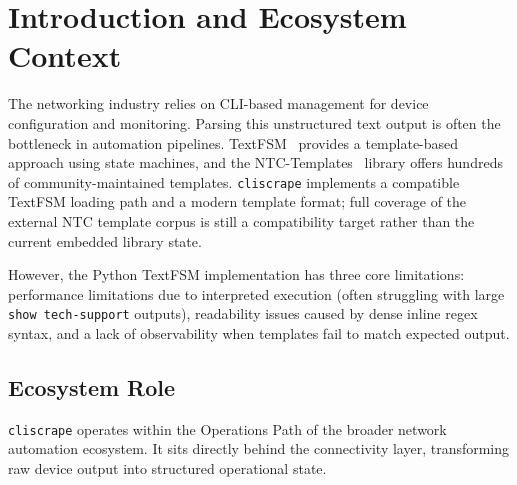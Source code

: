 \documentclass[a4paper,10pt]{article}
\begin{document}
\begin{acronym}[TextFSM]
\end{acronym}

\clearpage

\section{Introduction and Ecosystem Context}
\label{sec:intro}

The networking industry relies on CLI-based management for device
configuration and monitoring.  Parsing this unstructured text output
is often the bottleneck in automation pipelines.
TextFSM~\cite{textfsm2024} provides a template-based approach using
state machines, and the NTC-Templates~\cite{ntc_templates2024} library
offers hundreds of community-maintained templates. \texttt{cliscrape}
implements a compatible TextFSM loading path and a modern template format;
full coverage of the external NTC template corpus is still a compatibility
target rather than the current embedded library state.

However, the Python TextFSM implementation has three core limitations:
performance limitations due to interpreted execution (often struggling
with large \texttt{show tech-support} outputs), readability issues caused
by dense inline regex syntax, and a lack of observability when templates
fail to match expected output.

\subsection{Ecosystem Role}

\texttt{cliscrape} operates within the Operations Path of the broader
network automation ecosystem. It sits directly behind the connectivity layer,
transforming raw device output into structured operational state.
\end{document}

